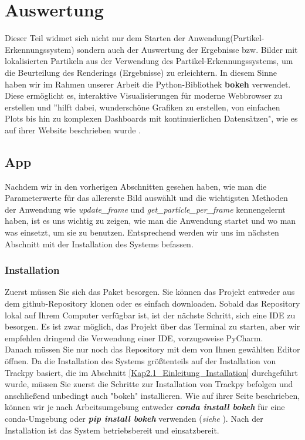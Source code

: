 \chapter{Auswertung \label{kap6}}
Dieser Teil widmet sich nicht nur dem Starten der Anwendung(Partikel-Erkennungssystem) sondern auch der Auswertung der Ergebnisse bzw. Bilder mit lokalisierten Partikeln aus der Verwendung des Partikel-Erkennungssystems, um die Beurteilung des Renderings (Ergebnisse) zu erleichtern.
In diesem Sinne haben wir im Rahmen unserer Arbeit die Python-Bibliothek \textbf{bokeh} verwendet. Diese ermöglicht es, interaktive Visualisierungen für moderne Webbrowser zu erstellen und ''hilft dabei, wunderschöne Grafiken zu erstellen, von einfachen Plots bis hin zu komplexen Dashboards mit kontinuierlichen Datensätzen", wie es auf ihrer Website beschrieben wurde \cite{bokeh}.

\section{App}
Nachdem wir in den vorherigen Abschnitten gesehen haben, wie man die Parameterwerte für das allererste Bild auswählt und die wichtigsten Methoden der Anwendung wie \textit{update\_frame} und \textit{get\_particle\_per\_frame} kennengelernt haben, ist es uns wichtig zu zeigen, wie man die Anwendung startet und wo man was einsetzt, um sie zu benutzen.
Entsprechend werden wir uns im nächsten Abschnitt mit der Installation des Systems befassen.

\subsection{Installation}
Zuerst müssen Sie sich das Paket besorgen. Sie können das Projekt entweder aus dem github-Repository \cite{particleTrackingSystem} klonen oder es einfach downloaden. Sobald das Repository lokal auf Ihrem Computer verfügbar ist, ist der nächste Schritt, sich eine IDE zu besorgen. Es ist zwar möglich, das Projekt über das Terminal zu starten, aber wir empfehlen dringend die Verwendung einer IDE, vorzugsweise PyCharm.\\
Danach müssen Sie nur noch das Repository mit dem von Ihnen gewählten Editor öffnen.  
Da die Installation des Systems größtenteils auf der Installation von Trackpy basiert, die im Abschnitt  \ref{Kap2.1_Einleitung_Installation} durchgeführt wurde, müssen Sie zuerst die Schritte zur Installation von Trackpy befolgen und anschließend unbedingt auch "bokeh" installieren.   
Wie auf ihrer Seite beschrieben, können wir je nach Arbeitsumgebung entweder \textsl{\textbf{conda install bokeh}} für eine conda-Umgebung oder \textsl{\textbf{pip install bokeh}} verwenden (\textit{siehe} \cite{bokeh}).
Nach der Installation ist das System betriebsbereit und einsatzbereit.

